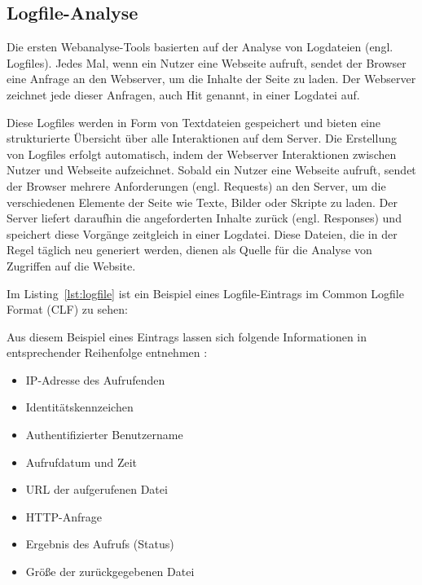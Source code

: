 \subsection{Logfile-Analyse}
\label{sec:logfiles}
Die ersten Webanalyse-Tools basierten auf der Analyse von Logdateien (engl. Logfiles). Jedes Mal, wenn ein Nutzer eine Webseite aufruft, sendet der Browser eine Anfrage an den Webserver, um die Inhalte der Seite zu laden. Der Webserver zeichnet jede dieser Anfragen, auch \glqq Hit\grqq{} genannt, in einer Logdatei auf. \parencite[S.8]{Dykes2014}

Diese Logfiles werden in Form von Textdateien gespeichert und bieten eine strukturierte Übersicht über alle Interaktionen auf dem Server. Die Erstellung von Logfiles erfolgt automatisch, indem der Webserver Interaktionen zwischen Nutzer und Webseite aufzeichnet. Sobald ein Nutzer eine Webseite aufruft, sendet der Browser mehrere Anforderungen (engl. Requests) an den Server, um die verschiedenen Elemente der Seite wie Texte, Bilder oder Skripte zu laden. Der Server liefert daraufhin die angeforderten Inhalte zurück (engl. Responses) und speichert diese Vorgänge zeitgleich in einer Logdatei. Diese Dateien, die in der Regel täglich neu generiert werden, dienen als Quelle für die Analyse von Zugriffen auf die Website. \parencite[Kap.2.2]{Hassler2019}

Im Listing~\ref{lst:logfile} ist ein Beispiel eines Logfile-Eintrags im Common Logfile Format (CLF) zu sehen:



Aus diesem Beispiel eines Eintrags lassen sich folgende Informationen in entsprechender Reihenfolge entnehmen \parencite{ApacheLogFiles}:

\begin{itemize}
    \item IP-Adresse des Aufrufenden
    \item Identitätskennzeichen
    \item Authentifizierter Benutzername
    \item Aufrufdatum und Zeit
    \item URL der aufgerufenen Datei
    \item HTTP-Anfrage
    \item Ergebnis des Aufrufs (Status)
    \item Größe der zurückgegebenen Datei
\end{itemize}

